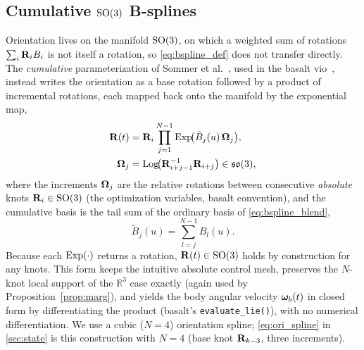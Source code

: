 \subsection{Cumulative $\mathrm{SO}(3)$ B-splines}
\label{sec:prelim_so3}
Orientation lives on the manifold $\mathrm{SO}(3)$, on which a weighted sum of
rotations $\sum_i \mathbf{R}_i B_i$ is not itself a rotation, so
\eqref{eq:bspline_def} does not transfer directly.  The
\emph{cumulative} parameterization of Sommer et
al.~\cite{sommer2020efficient}, used in the basalt
\ac{vio}~\cite{usenko2020basalt}, instead writes the orientation as a
base rotation followed by a product of incremental rotations, each
mapped back onto the manifold by the exponential map,
\begin{equation}
  \begin{aligned}
  \mathbf{R}(t) &= \mathbf{R}_{i}
           \prod_{j=1}^{N-1}
           \mathrm{Exp}\!\bigl(\tilde{B}_j(u)\,\boldsymbol{\Omega}_j\bigr), \\
  \boldsymbol{\Omega}_j &= \mathrm{Log}\!\bigl(\mathbf{R}_{i+j-1}^{-1}\mathbf{R}_{i+j}\bigr)\in\mathfrak{so}(3),
  \end{aligned}
  \label{eq:prelim_so3}
\end{equation}
where the increments $\boldsymbol{\Omega}_j$ are the relative rotations between
consecutive \emph{absolute} knots $\mathbf{R}_i\in\mathrm{SO}(3)$ (the optimization
variables, basalt convention), and the cumulative basis is the tail sum
of the ordinary basis of \eqref{eq:bspline_blend},
\begin{equation}
  \tilde{B}_j(u) = \sum_{l=j}^{N-1} B_l(u).
  \label{eq:cumbasis}
\end{equation}
Because each $\mathrm{Exp}(\cdot)$ returns a rotation, $\mathbf{R}(t)\in\mathrm{SO}(3)$ holds by
construction for any knots.  This form keeps the intuitive absolute
control mesh, preserves the $N$-knot local support of the $\mathbb{R}^3$
case exactly (again used by Proposition~\ref{prop:marg}), and yields the
body angular velocity $\boldsymbol{\omega}_b(t)$ in closed form by differentiating the
product (basalt's \texttt{evaluate\_lie()}), with no numerical
differentiation.  We use a cubic ($N{=}4$) orientation spline;
\eqref{eq:ori_spline} in \autoref{sec:state} is this construction with
$N{=}4$ (base knot $\mathbf{R}_{k-3}$, three increments).

